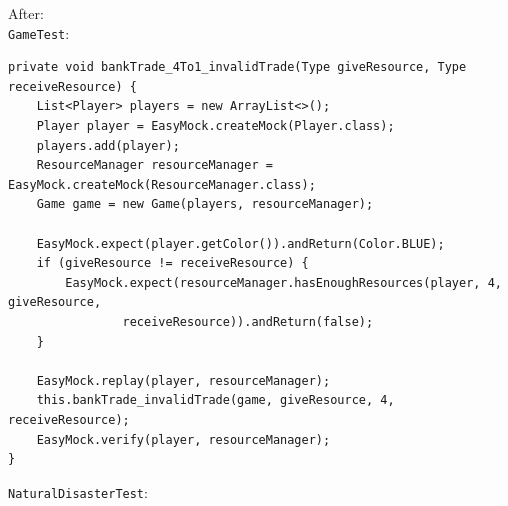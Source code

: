 \documentclass{fank1basedocument}
\begin{document}
After:\\
\texttt{GameTest}:
\begin{lstlisting}[style=javacode,language=myJava]
private void bankTrade_4To1_invalidTrade(Type giveResource, Type receiveResource) {
	List<Player> players = new ArrayList<>();
	Player player = EasyMock.createMock(Player.class);
	players.add(player);
	ResourceManager resourceManager = EasyMock.createMock(ResourceManager.class);
	Game game = new Game(players, resourceManager);

	EasyMock.expect(player.getColor()).andReturn(Color.BLUE);
	if (giveResource != receiveResource) {
		EasyMock.expect(resourceManager.hasEnoughResources(player, 4, giveResource,
				receiveResource)).andReturn(false);
	}

	EasyMock.replay(player, resourceManager);
	this.bankTrade_invalidTrade(game, giveResource, 4, receiveResource);
	EasyMock.verify(player, resourceManager);
}
\end{lstlisting}
\texttt{NaturalDisasterTest}:
\end{document}
